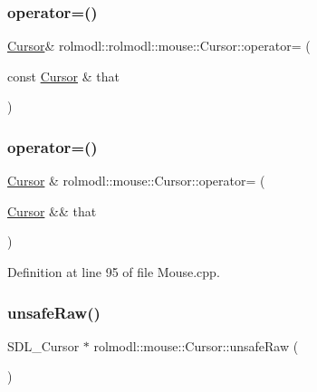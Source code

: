 \subsubsection{\texorpdfstring{operator=()}{operator=()}\hspace{0.1cm}{\footnotesize\ttfamily [1/2]}}
{\footnotesize\ttfamily \mbox{\hyperlink{classrolmodl_1_1rolmodl_1_1mouse_1_1_cursor}{Cursor}}\& rolmodl\+::rolmodl\+::mouse\+::\+Cursor\+::operator= (\begin{DoxyParamCaption}\item[{const \mbox{\hyperlink{classrolmodl_1_1rolmodl_1_1mouse_1_1_cursor}{Cursor}} \&}]{that }\end{DoxyParamCaption})\hspace{0.3cm}{\ttfamily [delete]}}

\mbox{\label{classrolmodl_1_1rolmodl_1_1mouse_1_1_cursor_a62947d22469e889189788fefd4efe1ca}} 
\subsubsection{\texorpdfstring{operator=()}{operator=()}\hspace{0.1cm}{\footnotesize\ttfamily [2/2]}}
{\footnotesize\ttfamily \mbox{\hyperlink{classrolmodl_1_1rolmodl_1_1mouse_1_1_cursor}{Cursor}} \& rolmodl\+::mouse\+::\+Cursor\+::operator= (\begin{DoxyParamCaption}\item[{\mbox{\hyperlink{classrolmodl_1_1rolmodl_1_1mouse_1_1_cursor}{Cursor}} \&\&}]{that }\end{DoxyParamCaption})\hspace{0.3cm}{\ttfamily [noexcept]}}



Definition at line 95 of file Mouse.\+cpp.

\mbox{\label{classrolmodl_1_1rolmodl_1_1mouse_1_1_cursor_a10d0d971261c62ae0cf2f68a4a9bd6ad}} 
\subsubsection{\texorpdfstring{unsafeRaw()}{unsafeRaw()}}
{\footnotesize\ttfamily S\+D\+L\+\_\+\+Cursor $\ast$ rolmodl\+::mouse\+::\+Cursor\+::unsafe\+Raw (\begin{DoxyParamCaption}{ }\end{DoxyParamCaption})\hspace{0.3cm}{\ttfamily [noexcept]}}




